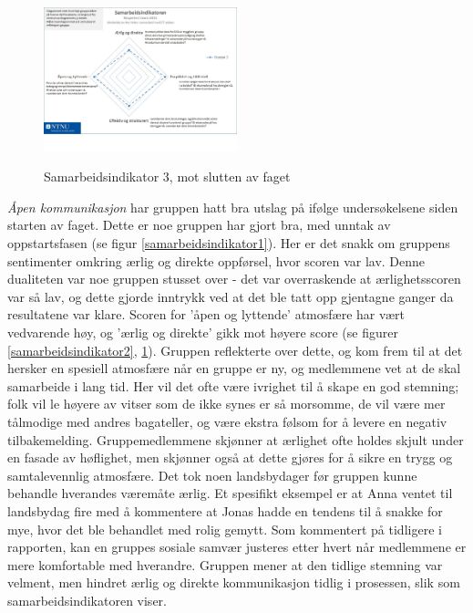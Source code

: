 \begin{figure}[h!]
  \caption{Samarbeidsindikator 3, mot slutten av faget}
  \centering
    \includegraphics[width=0.5\textwidth]{Bilder/samarbeidsindikator_3.jpg}\label{samarbeidsindikator3}
\end{figure}

\emph{Åpen kommunikasjon} har gruppen hatt bra utslag på ifølge undersøkelsene siden starten av faget. 
Dette er noe gruppen har gjort bra, med unntak av oppstartsfasen (se figur \ref{samarbeidsindikator1}).
Her er det snakk om gruppens sentimenter omkring ærlig og direkte oppførsel, hvor scoren var lav.
Denne dualiteten var noe gruppen stusset over - det var overraskende at ærlighetsscoren var så lav, og dette gjorde inntrykk ved at det ble tatt opp gjentagne ganger da resultatene var klare.
Scoren for 'åpen og lyttende' atmosfære har vært vedvarende høy, og 'ærlig og direkte' gikk mot høyere score (se figurer \ref{samarbeidsindikator2}, \ref{samarbeidsindikator3}).
Gruppen reflekterte over dette, og kom frem til at det hersker en spesiell atmosfære når en gruppe er ny, og medlemmene vet at de skal samarbeide i lang tid.
Her vil det ofte være ivrighet til å skape en god stemning; folk vil le høyere av vitser som de ikke synes er så morsomme, de vil være mer tålmodige med andres bagateller, og være ekstra følsom for å levere en negativ tilbakemelding.
Gruppemedlemmene skjønner at ærlighet ofte holdes skjult under en fasade av høflighet, men skjønner også at dette gjøres for å sikre en trygg og samtalevennlig atmosfære. Det tok noen landsbydager før gruppen kunne behandle hverandes væremåte ærlig.
Et spesifikt eksempel er at Anna ventet til landsbydag fire med å kommentere at Jonas hadde en tendens til å snakke for mye, hvor det ble behandlet med rolig gemytt. 
Som kommentert på tidligere i rapporten, kan en gruppes sosiale samvær justeres etter hvert når medlemmene er mere komfortable med hverandre. 
Gruppen mener at den tidlige stemning var velment, men hindret ærlig og direkte kommunikasjon tidlig i prosessen, slik som samarbeidsindikatoren viser. 
